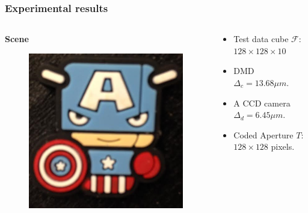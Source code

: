 \documentclass{beamer}
\begin{document}
\begin{frame}
\frametitle{Experimental results}

\begin{columns}
\column{2in}
\begin{center}
\textbf{Scene}
\begin{figure}
\includegraphics[scale=0.6]{FiguresUpd/real_cel.png}
\end{figure}
\vspace{-10pt}

\end{center}
\column{3in}
\begin{small}
\begin{itemize}
\item Test data cube $\mathcal{F}$: $128 \times 128 \times 10$ 
\item DMD $\Delta_c=13.68\mu m$.
\item A CCD camera $\Delta_d=6.45 \mu m$. 
\item Coded Aperture $T$: $128\times128$ pixels. 
\end{itemize}
\end{small}

\end{columns}
\end{frame}

\end{document}
